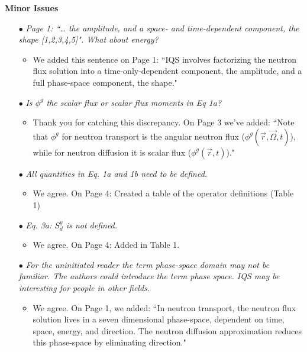 \documentclass[11pt]{letter}
\newcommand{\section}[1]{\textbf{#1}}
\newcommand{\working}{$\bullet$}
\newcommand{\done}{$\bullet$}
\newcommand{\easy}[1]{{\textit{#1}}}
\begin{document}
\begin{itemize}
\end{itemize}

\newpage
\section{Minor Issues}

\begin{itemize}

\item[\done] \easy{ Page 1: ``… the amplitude, and a space- and time-dependent component, the shape [1,2,3,4,5]". What about energy? }
\begin{itemize}
\item We added this sentence on Page 1: ``IQS involves factorizing the neutron flux solution into a time-only-dependent component, the amplitude, and a full phase-space component, the shape."
\end{itemize}

\item[\done] \easy{ Is $\phi^g$ the scalar flux or scalar flux moments in Eq 1a? }
\begin{itemize}
\item Thank you for catching this discrepancy. On Page 3 we've added: ``Note that $\phi^g$ for neutron transport is the angular neutron flux ($\phi^g(\vec r, \vec\Omega, t)$), while for neutron diffusion it is scalar flux ($\phi^g(\vec r, t)$)."
\end{itemize}

\item[\working] \easy{ All quantities in Eq. 1a and 1b need to be defined. }
\begin{itemize}
\item We agree. On Page 4: Created a table of the operator definitions (Table 1)
\end{itemize}

\item[\done] \easy{ Eq. 3a: $S_d^g$ is not defined. }
\begin{itemize}
\item We agree. On Page 4: Added in Table 1.
\end{itemize}

\item[\done] \easy{ For the uninitiated reader the term phase-space domain may not be familiar. The authors could introduce the term phase space. IQS may be interesting for people in other fields. }
\begin{itemize}
\item We agree. On Page 1, we added: ``In neutron transport, the neutron flux solution lives in a seven dimensional phase-space, dependent on time, space, energy, and direction. The neutron diffusion approximation reduces this phase-space by eliminating direction."
\end{itemize}


\end{itemize}
\end{document}
